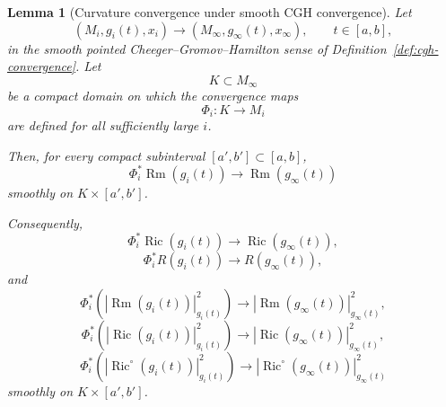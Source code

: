 \documentclass[11pt]{article}
\theoremstyle{plain}
\newtheorem{lemma}[theorem]{Lemma}
\theoremstyle{definition}
\theoremstyle{remark}
\newcommand{\Ric}{\operatorname{Ric}}
\newcommand{\Rm}{\operatorname{Rm}}
\newcommand{\norm}[1]{\left|#1\right|}
\begin{document}
\begin{lemma}[Curvature convergence under smooth CGH convergence]
\label{lem:cgh-curvature-convergence}
Let
\[
(M_i,g_i(t),x_i)\to (M_\infty,g_\infty(t),x_\infty),
\qquad
 t\in [a,b],
\]
in the smooth pointed Cheeger--Gromov--Hamilton sense of
Definition~\ref{def:cgh-convergence}. Let
\[
K\subset M_\infty
\]
be a compact domain on which the convergence maps
\[
\Phi_i:K\to M_i
\]
are defined for all sufficiently large $i$.

Then, for every compact subinterval $[a',b']\subset [a,b]$,
\[
\Phi_i^*\Rm(g_i(t))\to \Rm(g_\infty(t))
\]
smoothly on $K\times [a',b']$.

Consequently,
\[
\Phi_i^*\Ric(g_i(t))\to \Ric(g_\infty(t)),
\]
\[
\Phi_i^*R(g_i(t))\to R(g_\infty(t)),
\]
and
\[
\Phi_i^*\left(\norm{\Rm(g_i(t))}_{g_i(t)}^2\right)
\to
\norm{\Rm(g_\infty(t))}_{g_\infty(t)}^2,
\]
\[
\Phi_i^*\left(\norm{\Ric(g_i(t))}_{g_i(t)}^2\right)
\to
\norm{\Ric(g_\infty(t))}_{g_\infty(t)}^2,
\]
\[
\Phi_i^*\left(\norm{\Ric^\circ(g_i(t))}_{g_i(t)}^2\right)
\to
\norm{\Ric^\circ(g_\infty(t))}_{g_\infty(t)}^2
\]
smoothly on $K\times [a',b']$.
\end{lemma}
\end{document}
